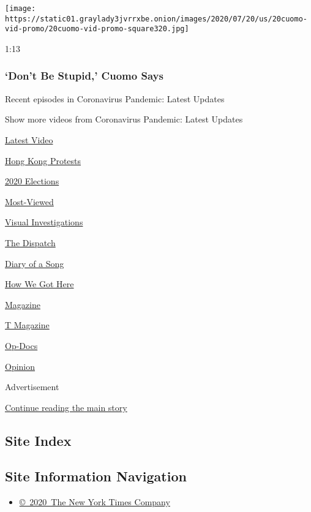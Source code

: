 \begin{itemize}
  \texttt{[image: https://static01.graylady3jvrrxbe.onion/images/2020/07/20/us/20cuomo-vid-promo/20cuomo-vid-promo-square320.jpg]}

  1:13

  \hypertarget{dont-be-stupid-cuomo-says}{%
  \subsubsection{`Don't Be Stupid,' Cuomo
  Says}\label{dont-be-stupid-cuomo-says}}
\end{itemize}

Recent episodes in Coronavirus Pandemic: Latest Updates

Show more videos from Coronavirus Pandemic: Latest Updates

\href{/video}{}

\href{/video/latest-video}{Latest Video}

\href{/video/hk-protest}{Hong Kong Protests}

\href{/video/2020-Elections}{2020 Elections}

\href{/video/Most-Viewed}{Most-Viewed}

\href{/video/investigations}{Visual Investigations}

\href{/video/on-the-ground}{The Dispatch}

\href{/video/diaryofasong}{Diary of a Song}

\href{/video/how-we-got-here}{How We Got Here}

\href{/video/magazine}{Magazine}

\href{/video/t-magazine}{T Magazine}

\href{/video/op-docs}{Op-Docs}

\href{/video/opinion}{Opinion}

Advertisement

\protect\hyperlink{after-bottom}{Continue reading the main story}

\hypertarget{site-index}{%
\subsection{Site Index}\label{site-index}}

\hypertarget{site-information-navigation}{%
\subsection{Site Information
Navigation}\label{site-information-navigation}}

\begin{itemize}
\tightlist
\item
  \href{https://help.nytimes3xbfgragh.onion/hc/en-us/articles/115014792127-Copyright-notice}{©~2020~The
  New York Times Company}
\end{itemize}

